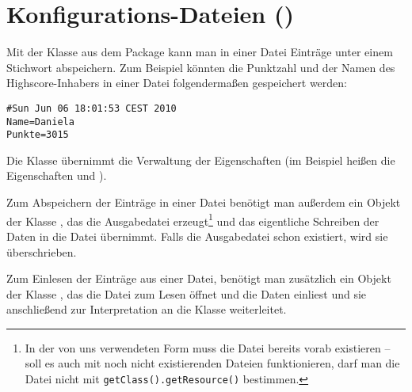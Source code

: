 \clearpage

\rehead[]{\textcolor{lightblue}{AvHG, Inf, My}}
\lohead[]{\textcolor{lightblue}{AvHG, Inf, My}}

\section{Konfigurations-Dateien ()}

Mit der Klasse  aus dem Package  kann
man in einer Datei Einträge unter einem Stichwort abspeichern. Zum Beispiel
könnten die Punktzahl und der Namen des Highscore-Inhabers in einer Datei
folgendermaßen gespeichert werden:

\begin{lstlisting}
#Sun Jun 06 18:01:53 CEST 2010
Name=Daniela
Punkte=3015
\end{lstlisting}

Die Klasse  übernimmt die Verwaltung der Eigenschaften (im
Beispiel heißen die Eigenschaften  und ).

Zum Abspeichern der Einträge in einer Datei benötigt man außerdem ein
Objekt der Klasse , das die Ausgabedatei
erzeugt\footnote{In der von uns verwendeten Form muss die Datei bereits vorab
existieren -- soll es auch mit noch nicht existierenden Dateien funktionieren,
darf man die Datei nicht mit \lstinline|getClass().getResource()| bestimmen.}
und das eigentliche Schreiben der Daten in die Datei übernimmt. Falls die
Ausgabedatei schon existiert, wird sie überschrieben.

Zum Einlesen der Einträge aus einer Datei, benötigt man zusätzlich ein Objekt
der Klasse , das die Datei zum Lesen öffnet und die
Daten einliest und sie anschließend zur Interpretation an die Klasse
 weiterleitet.

